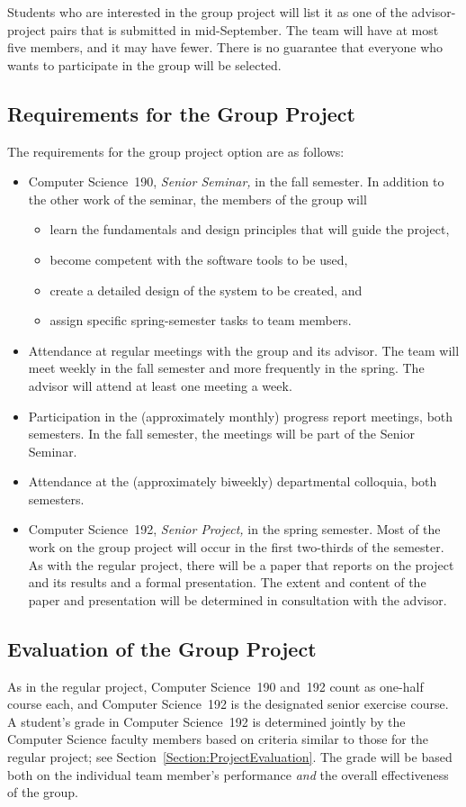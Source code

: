 \documentclass[finalcopy]{srpaper}
\def\hyperref[#1]{}
\let\plainref\ref
\newcommand{\plainref}{\ref*}
\newcommand{\namedref}[2]{\hyperref[#2]{#1~\plainref{#2}}}
\begin{document}
Students who are interested in the group project will list it
as one of the advisor-project pairs that is submitted in
mid-September. The team will have at most five members, and it
may have fewer. There is no guarantee that
everyone who wants to participate in the group will be
selected.

\subsection*{Requirements for the Group Project}
%
The requirements for the group project option are as follows:
\begin{itemize}
\item
Computer Science~190, \textit{Senior Seminar,} in the fall
semester. In addition to the other work of the seminar, the
members of the group will
\begin{itemize}
\item
learn the fundamentals and design principles that will guide
the project,
\item
become competent with the software tools to be
used,
\item
create a detailed design of the system to be created, and
\item
assign specific spring-semester tasks to team members.
\end{itemize}
\item
Attendance at regular meetings with the group and its advisor. 
The team will meet weekly in the fall semester and more
frequently in the spring. The advisor will attend at least
one meeting a week.
\item
Participation in the (approximately monthly) progress
report meetings, both semesters. In the fall semester, the
meetings will be part of the Senior Seminar.
\item
Attendance at the (approximately biweekly) departmental
colloquia, both semesters.
\item
Computer Science~192, \textit{Senior Project,} in the spring
semester. Most of the work on the group project will occur in the
first two-thirds of the semester. As with the regular project,
there will be a paper that reports on the project and its results
and a formal presentation. The extent and content of the paper
and presentation will be determined in consultation with the
advisor.
\end{itemize}

\subsection*{Evaluation of the Group Project}
As in the regular project, Computer Science~190 and~192 count as one-half course
each, and Computer Science~192 is the designated senior exercise
course. A student's grade in Computer Science~192 is determined jointly
by the Computer Science faculty members based on criteria similar to
those for the regular project; see \namedref{Section}{Section:ProjectEvaluation}.
The grade will be based both on the individual team member's performance \emph{and}
the overall effectiveness of the group.
\end{document}
